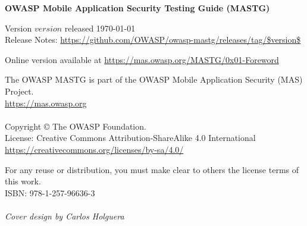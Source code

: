 \thispagestyle{empty} %

\textbf{OWASP Mobile Application Security Testing Guide (MASTG)}

Version $version$ released \today \\

Release Notes: \url{https://github.com/OWASP/owasp-mastg/releases/tag/$version$}

Online version available at \url{https://mas.owasp.org/MASTG/0x01-Foreword}

The OWASP MASTG is part of the OWASP Mobile Application Security (MAS) Project. \\
\url{https://mas.owasp.org} \\ \\

Copyright © The OWASP Foundation. \\

License: Creative Commons Attribution-ShareAlike 4.0 International \\
\url{https://creativecommons.org/licenses/by-sa/4.0/}

For any reuse or distribution, you must make clear to others the license terms of this work.\\

ISBN: 978-1-257-96636-3 \\ \\


\emph{Cover design by Carlos Holguera}